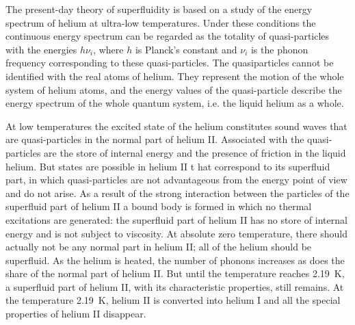 The present-day theory of superfluidity is based on a study of the energy spectrum of helium at ultra-low temperatures. Under these conditions the continuous energy spectrum can be regarded as the totality of quasi-particles with the energies $h \nu_{i}$, where $h$ is Planck's constant and $\nu_{i}$ is the phonon frequency  corresponding to these quasi-particles. The quasiparticles cannot be identified with the real atoms of helium. They repre­sent the motion of the whole system of helium atoms, and the energy values of the quasi-particle describe the energy spectrum of the whole quantum system, i.e. the liquid helium as a whole. 

At low temperatures the excited state of the helium constitutes sound waves that are quasi-particles in the normal part of he­lium II. Associated with the quasi-particles are the store of internal energy and the presence of friction in the liquid he­lium. But states are possible in helium II t hat correspond to its superfluid part, in which quasi-particles are not advantageous from the energy point of view and do not arise. As a result of the strong interaction between the particles of the superfluid part of helium II a bound body is formed in which no thermal excitations are generated: the superfluid part of helium II has no store of internal energy and is not subject to viscosity. At absolute zero temperature, there should actually not be any normal part in helium II; all of the helium should be superfluid. As the helium is heated, the number of phonons increases as does the share of the normal part of helium II. But until the temperature reaches \SI{2.19}{\kelvin}, a superfluid part of helium II, with its characteristic properties, still remains. At the temper­ature \SI{2.19}{\kelvin}, helium II is converted into helium I and all the special properties of helium II disappear.
